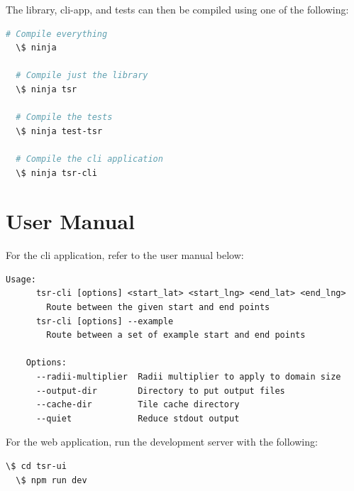 \documentclass[12pt]{article}
\begin{document}
\begin{appendices}
  \noindent The library, cli-app, and tests can then be compiled using one of the following:

  \begin{lstlisting}[language=bash]
  # Compile everything
  \$ ninja

  # Compile just the library
  \$ ninja tsr

  # Compile the tests
  \$ ninja test-tsr

  # Compile the cli application
  \$ ninja tsr-cli
\end{lstlisting}

  \pagebreak
  \section{User Manual}

  For the cli application, refer to the user manual below:

  \begin{lstlisting}[]
  Usage: 
      tsr-cli [options] <start_lat> <start_lng> <end_lat> <end_lng>
        Route between the given start and end points
      tsr-cli [options] --example  
        Route between a set of example start and end points

    Options:
      --radii-multiplier  Radii multiplier to apply to domain size
      --output-dir        Directory to put output files
      --cache-dir         Tile cache directory
      --quiet             Reduce stdout output
\end{lstlisting}

  For the web application, run the development server with the following:

  \begin{lstlisting}[language=bash]
  \$ cd tsr-ui
  \$ npm run dev
\end{lstlisting}

  \pagebreak
  
  

\end{appendices}
\end{document}
